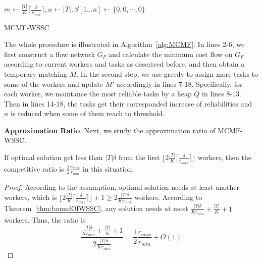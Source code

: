 \begin{algorithm}[t]
	$m \leftarrow \frac{|T|}{K}\lceil \frac{\delta}{r_{max}} \rceil, n \leftarrow |T|, S[1 \ldots n] \leftarrow \{0,0,\cdots,0\}$\;
\caption{MCMF-WSSC}
\label{alg:MCMF}
\end{algorithm}

The whole procedure is illustrated in Algorithm~\ref{alg:MCMF}. 
In lines 2-6, we first construct a flow network $G_F$ and calculate
the minimum cost flow on $G_F$ according to current workers and tasks as descrived before, 
and then obtain a temporary matching $M$. 
In the second step, we use greedy to assign more tasks to some of the workers and update $M'$ accordingly
in lines 7-18. Specifically, for each worker, we maintance the most reliable tasks by a heap $Q$ in lines 8-13.
Then in lines 14-18, the tasks get their corresponded increase of reliabilities and $n$ is reduced when some of them reach to threshold. 

\textbf{Approximation Ratio}. 
Next, we study the approximation ratio of MCMF-WSSC.

\begin{lemma}
If optimal solution get less than $|T|\delta$ from the first $\lfloor 2\frac{|T|}{K}\lceil \frac{\delta}{r_{max}} \rceil \rfloor$ workers,
then the competitive ratio is $\frac{1}{2}\frac{r_{max}}{r_{min}}$ in this situation.
\end{lemma}
\begin{proof}
According to the assumption, optimal solution needs at least another workers,
which is $\lfloor 2\frac{|T|}{K}\lceil \frac{\delta}{r_{max}} \rceil \rfloor + 1 \ge 2\frac{|T|\delta}{Kr_{max}}$ workers.
According to Theorem~\ref{thm:boundOfWSSC}, any solution needs at most $\frac{|T|\delta}{Kr_{min}} + \frac{|T|}{K} + 1$ workers.
Thus, the ratio is 
\begin{equation*}
	\frac{\frac{|T|\delta}{Kr_{min}} + \frac{|T|}{K} + 1}{2\frac{|T|\delta}{Kr_{max}}} = \frac{1}{2}\frac{r_{max}}{r_{min}} + O(1)
\end{equation*}
\end{proof}

